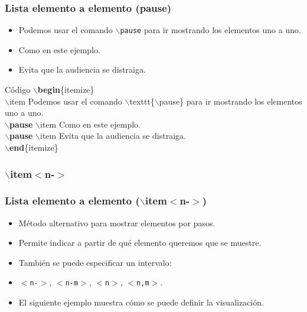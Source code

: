 \documentclass[aspectratio=43]{beamer}%
\begin{document}
\begin{frame}[fragile]
\frametitle{\textbf{Lista elemento a elemento (pause)}}
\justifying
 \begin{itemize}\justifying
  \item Podemos usar el comando \texttt{$\backslash$pause} para ir mostrando los elementos uno a uno.
  \pause \item Como en este ejemplo.
  \pause \item Evita que la audiencia se distraiga.
\end{itemize}

\begin{exampleblock}{Código}
 $\backslash$\textbf{begin}\{itemize\}\\
  $\backslash$item Podemos usar el comando $\backslash$texttt\{$\backslash$pause\} para ir mostrando los elementos uno a uno.\\
  $\backslash$\textbf{pause} $\backslash$item Como en este ejemplo.\\
  $\backslash$\textbf{pause} $\backslash$item Evita que la audiencia se distraiga.\\
$\backslash$\textbf{end}\{itemize\}
\end{exampleblock}

\end{frame}

\subsubsection{$\backslash$item$<$n-$>$}
\begin{frame}[fragile]
\frametitle{\textbf{Lista elemento a elemento ($\backslash$item$<$n-$>$)}}
\justifying
 \begin{itemize}\justifying
  \item Método alternativo para mostrar elementos por pasos.
  \item Permite indicar a partir de qué elemento queremos que se muestre.
  \item También se puede especificar un intervalo:
  \item [] \texttt{$<$n-$>$}, \texttt{$<$n-m$>$}, \texttt{$<$n$>$}, \texttt{$<$n,m$>$}.
  \item El siguiente ejemplo muestra cómo se puede definir la visualización.
\end{itemize}

\end{frame}
\end{document}
